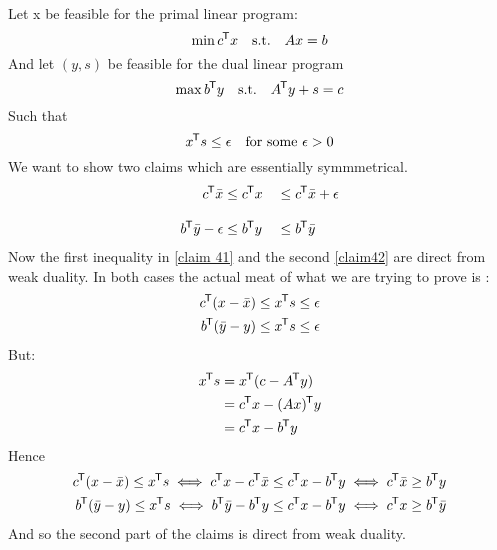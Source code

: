\documentclass{article}
\newcommand*{\tran}{^{\mkern-1.5mu\mathsf{T}}}%
\begin{document}
	Let x be feasible for the primal linear program:
	\begin{equation}\label{eq:1}
		\min c\tran x \quad \text{s.t.} \quad Ax = b
	\end{equation}
	And let $(y,s)$ be feasible for the dual linear program 
	\begin{equation}\label{eq:2}
		\max b\tran y \quad \text{s.t.} \quad A\tran y + s =c
	\end{equation}
	Such that
	\begin{equation}\label{eq:3}
		x\tran s \leq \epsilon \quad \text{for some } \epsilon >0
	\end{equation}
	We want to show two claims which are essentially symmmetrical. 
	\begin{alignat}{2}
		c\tran \bar x &\leq c\tran x &&\leq c\tran \bar x + \epsilon
		\label{claim 41}\\[2ex] 
		b\tran \bar y - \epsilon & \leq b\tran y &&\leq b\tran \bar y
		\label{claim42}
	\end{alignat}
	Now the first inequality in \ref{claim 41} and the second \ref{claim42} are direct from weak duality. In both cases the actual meat of what we are trying to prove is :
	\begin{align}
	c\tran (x - \bar x) \leq x\tran s \leq \epsilon\\
	b\tran (\bar y - y) \leq x\tran s \leq \epsilon
	\end{align}
	But:
	\begin{align}
		x\tran s&= x\tran (c- A\tran y)\\
		&= c\tran x - (Ax)\tran y\\
		&= c\tran x  - b\tran y
	\end{align}
	Hence
	\begin{align}
		c\tran (x - \bar x) \leq x\tran s \iff c\tran x - c\tran \bar x \leq c\tran x - b\tran y \iff c\tran \bar x \geq b\tran y\\
		b\tran (\bar y - y) \leq x\tran s  \iff b\tran \bar y - b\tran y \leq c\tran x - b\tran y \iff c\tran x \geq b\tran \bar y
	\end{align}
	And so the second part of the claims is direct from weak duality. 
	
	
\end{document}
